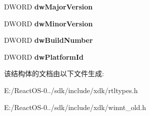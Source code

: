 \begin{DoxyCompactItemize}
D\+W\+O\+RD {\bfseries dw\+Major\+Version}
\item 
\mbox{\label{struct___o_s_v_e_r_s_i_o_n_i_n_f_o_a_a5ffdc563dec5b482fe0d1e0dfb6c5f7a}} 
D\+W\+O\+RD {\bfseries dw\+Minor\+Version}
\item 
\mbox{\label{struct___o_s_v_e_r_s_i_o_n_i_n_f_o_a_a64d27b80efd565f1fe94dee99c3f3bc2}} 
D\+W\+O\+RD {\bfseries dw\+Build\+Number}
\item 
\mbox{\label{struct___o_s_v_e_r_s_i_o_n_i_n_f_o_a_a02b53cf0501c1266fd412fb6f615e111}} 
D\+W\+O\+RD {\bfseries dw\+Platform\+Id}
\end{DoxyCompactItemize}


该结构体的文档由以下文件生成\+:\begin{DoxyCompactItemize}
\item 
E\+:/\+React\+O\+S-\/0../sdk/include/xdk/rtltypes.\+h\item 
E\+:/\+React\+O\+S-\/0../sdk/include/xdk/winnt\+\_\+old.\+h\end{DoxyCompactItemize}
